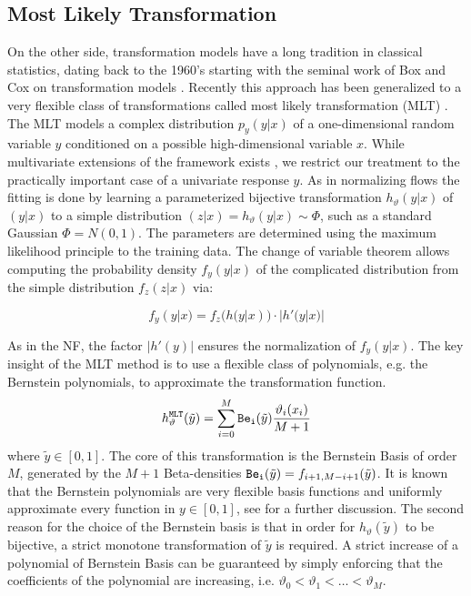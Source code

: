 \documentclass[a4paper,conference]{IEEEtran}
\begin{document}
\subsection{Most Likely Transformation}
On the other side, transformation models have a long tradition in classical statistics, dating back to the 1960’s starting with the seminal work of Box and Cox on transformation models \cite{Box1964}. Recently this approach has been generalized to a very flexible class of  transformations called most likely transformation (MLT) \cite{Hothorn2018}. The MLT models a complex distribution $p_y(y|x)$ of a one-dimensional random variable $y$ conditioned on a possible high-dimensional variable $x$. While multivariate extensions of the framework exists \cite{Klein2019}, we restrict our treatment to the practically important case of a univariate response $y$. As in normalizing flows the fitting is done by learning a parameterized bijective transformation $h_\vartheta(y|x)$ of $(y|x)$ to a simple distribution $(z|x)=h_\vartheta(y|x) \sim \Phi$, such as a standard Gaussian $\Phi=N(0,1)$. The parameters are determined using the maximum likelihood principle to the training data. The change of variable theorem allows computing the probability density $f_y(y|x)$ of the complicated distribution from the simple distribution $f_z(z|x)$ via:

\begin{equation}
    f_y(y|x)=f_z(h(y|x)) \cdot |h'(y|x)|    
\end{equation}

As in the NF, the factor $|h'(y)|$ ensures the normalization of $f_y(y|x)$. The key insight of the MLT method is to use a flexible class of polynomials, e.g. the Bernstein polynomials, to approximate the transformation function.
\begin{equation}
    h_\vartheta^{\tt MLT}(\tilde y) = \sum_{i=0}^M {\tt Be_i}(\tilde{y}) \frac{\vartheta_i(x_i)}{M+1}
\end{equation}
where $\tilde  y\in [0,1]$. The core of this transformation is the Bernstein Basis of order $M$, generated by the $M+1$ Beta-densities  ${\tt Be_i}(\tilde{y}) = f_{i+1, M-i+1}(\tilde y)$. It is known that the Bernstein polynomials are very flexible basis functions and uniformly approximate every function in $y \in [0,1]$, see \cite{Hothorn2018} for a further discussion. The second reason for the choice of the Bernstein basis is that in order for $h_\vartheta(\tilde y)$ to be bijective, a strict monotone transformation of $\tilde y$ is required. A strict increase of a polynomial of Bernstein Basis can be guaranteed by simply enforcing that the coefficients of the polynomial are increasing, i.e. $\vartheta_0 < \vartheta_1 < \ldots < \vartheta_M$.
\end{document}
